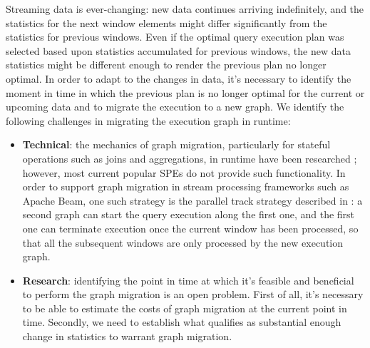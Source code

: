 Streaming data is ever-changing: new data continues arriving indefinitely, and the statistics for the next window elements might differ significantly from the statistics for previous windows. Even if the optimal query execution plan was selected based upon statistics accumulated for previous windows, the new data statistics might be different enough to render the previous plan no longer optimal. In order to adapt to the changes in data, it's necessary to identify the moment in time in which the previous plan is no longer optimal for the current or upcoming data and to migrate the execution to a new graph. %
We identify the following challenges in migrating the execution graph in runtime:
\begin{itemize}
    \item \textbf{Technical}: the mechanics of graph migration, particularly for stateful operations such as joins and aggregations, in runtime have been researched \cite{zhu2004dynamic}; %
    however, most current popular SPEs do not provide such functionality. In order to support graph migration in stream processing frameworks such as Apache Beam, one such strategy is the parallel track strategy described in \cite{zhu2004dynamic}: a second graph can start the query execution along the first one, and the first one can terminate execution once the current window has been processed, so that all the subsequent windows are only processed by the new execution graph.
    \item \textbf{Research}: identifying the point in time at which it's feasible and beneficial to perform the graph migration is an open problem. First of all, it's necessary to be able to estimate the costs of graph migration at the current point in time. Secondly, we need to establish what qualifies as substantial enough change in statistics to warrant graph migration. %
\end{itemize}